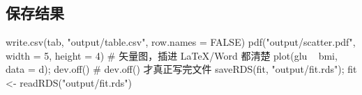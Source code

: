 \subsection{保存结果}
\begin{RCode}[R · 存表、存图、存模型]
write.csv(tab, "output/table.csv", row.names = FALSE)
pdf("output/scatter.pdf", width = 5, height = 4)    # 矢量图，插进 LaTeX/Word 都清楚
plot(glu ~ bmi, data = d); dev.off()                 # dev.off() 才真正写完文件
saveRDS(fit, "output/fit.rds"); fit <- readRDS("output/fit.rds")
\end{RCode}
